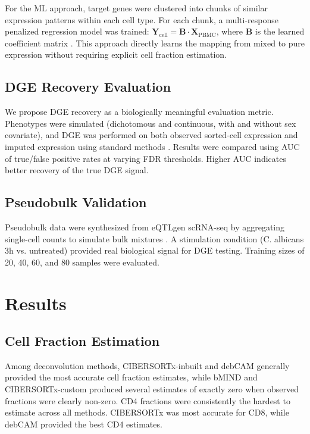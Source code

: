 \documentclass[12pt]{article}
\begin{document}
For the ML approach, target genes were clustered into chunks of similar expression patterns within each cell type. For each chunk, a multi-response penalized regression model was trained: $\mathbf{Y}_\text{cell} = \mathbf{B} \cdot \mathbf{X}_\text{PBMC}$, where $\mathbf{B}$ is the learned coefficient matrix \citep{tibshirani1996lasso, hoerl1970ridge}. This approach directly learns the mapping from mixed to pure expression without requiring explicit cell fraction estimation.

\subsection{DGE Recovery Evaluation}

We propose DGE recovery as a biologically meaningful evaluation metric. Phenotypes were simulated (dichotomous and continuous, with and without sex covariate), and DGE was performed on both observed sorted-cell expression and imputed expression using standard methods \citep{love2014deseq2}. Results were compared using AUC of true/false positive rates at varying FDR thresholds. Higher AUC indicates better recovery of the true DGE signal.

\subsection{Pseudobulk Validation}

Pseudobulk data were synthesized from eQTLgen scRNA-seq by aggregating single-cell counts to simulate bulk mixtures \citep{eqtlgen2019}. A stimulation condition (C. albicans 3h vs. untreated) provided real biological signal for DGE testing. Training sizes of 20, 40, 60, and 80 samples were evaluated.

\section{Results}

\subsection{Cell Fraction Estimation}

Among deconvolution methods, CIBERSORTx-inbuilt and debCAM generally provided the most accurate cell fraction estimates, while bMIND and CIBERSORTx-custom produced several estimates of exactly zero when observed fractions were clearly non-zero. CD4 fractions were consistently the hardest to estimate across all methods. CIBERSORTx was most accurate for CD8, while debCAM provided the best CD4 estimates.
\end{document}
